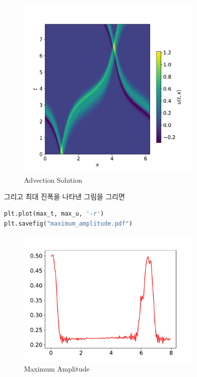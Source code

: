 \documentclass[11pt]{article}
\begin{document}
\begin{figure}[!ht]
  \centering
  \includegraphics[width=0.8\textwidth]{Advection_solution.pdf}
  \caption{Advection Solution}
\end{figure}


그리고 최대 진폭을 나타낸 그림을 그리면
\begin{lstlisting}[language=Python]
plt.plot(max_t, max_u, '-r')
plt.savefig("maximum_amplitude.pdf")
\end{lstlisting}
\pagebreak
\begin{figure}[!ht]
  \centering
  \includegraphics[width=0.8\textwidth]{maximum_amplitude.pdf}
  \caption{Maximum Amplitude}
\end{figure}



\pagebreak
\end{document}
